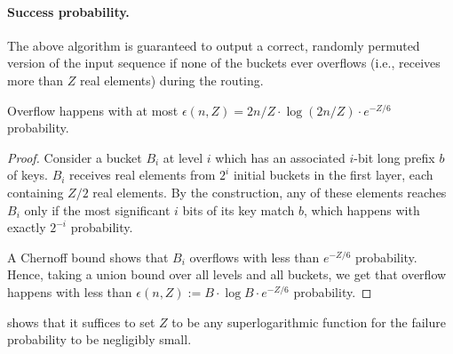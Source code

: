 \paragraph{Success probability.} The above algorithm is guaranteed to output a correct, randomly permuted version of the input sequence if none of the buckets ever overflows (i.e., receives more than $Z$ real elements) during the routing.

\begin{lemma}
    Overflow happens  with  at most $\epsilon(n,Z) =2n/Z\cdot\log(2n/Z)\cdot e^{-Z/6}$ probability.
\label{lem:overflow}
\end{lemma}

\begin{proof}
    Consider a bucket $B_i$ at level $i$ which has an associated $i$-bit long prefix $b$ of keys. $B_i$ receives real  elements from $2^i$ initial buckets in the first layer,  each  containing $Z/2$ real  elements. By the construction, any of these elements reaches $B_i$ only if the most significant $i$ bits  of its  key match $b$, which happens with exactly $2^{-i}$ probability. 
    
    A Chernoff bound  shows that $B_i$ overflows  with  less  than $e^{-Z/6}$ probability. Hence, taking a union  bound  over  all  levels and all buckets, we get that overflow happens with less than $\epsilon(n,Z) := B\cdot \log B\cdot e^{-Z/6}$ probability.
\end{proof}

shows that it suffices to set $Z$ to be any superlogarithmic 
function for the failure probability to be negligibly small.

